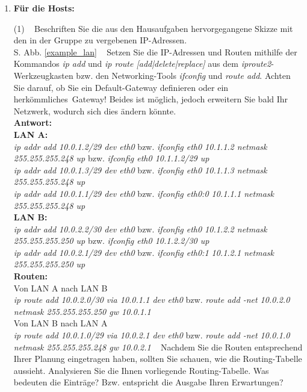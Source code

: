 \documentclass[paper=a4,fontsize=11pt]{scrartcl}%
\numberwithin{equation}{section}
\begin{document}
\begin{enumerate}
	\item \textbf{Für die Hosts:}\\
	\begin{tasks}(1)
		\task~ Beschriften Sie die aus den Hausaufgaben hervorgegangene Skizze mit den in der Gruppe zu vergebenen IP-Adressen.\\
		S. Abb. \ref{example_lan}
		\task~ Setzen Sie die IP-Adressen und Routen mithilfe der Kommandos \emph{ip add} und \emph{ip route [add|delete|replace]} aus dem \emph{iproute2}-Werkzeugkasten bzw. den Networking-Tools \emph{ifconfig} und \emph{route add}.  Achten Sie darauf, ob Sie ein Default-Gateway definieren oder ein \glqq herkömmliches\grqq\ Gateway! Beides ist möglich, jedoch erweitern Sie bald Ihr Netzwerk, wodurch sich dies ändern könnte.\\
		\textbf{Antwort:}\\
		\textbf{LAN A:}\\
		\textit{ip addr add 10.0.1.2/29 dev eth0} bzw. \textit{ifconfig eth0 10.1.1.2 netmask 255.255.255.248 up} bzw. \textit{ifconfig eth0 10.1.1.2/29 up}\\
		\textit{ip addr add 10.0.1.3/29 dev eth0} bzw. \textit{ifconfig eth0 10.1.1.3 netmask 255.255.255.248 up}\\
		\textit{ip addr add 10.0.1.1/29 dev eth0} bzw. \textit{ifconfig eth0:0 10.1.1.1 netmask 255.255.255.248 up}\\
		\textbf{LAN B:}\\
		\textit{ip addr add 10.0.2.2/30 dev eth0} bzw. \textit{ifconfig eth0 10.1.2.2 netmask 255.255.255.250 up} bzw. \textit{ifconfig eth0 10.1.2.2/30 up}\\
		\textit{ip addr add 10.0.2.1/29 dev eth0} bzw. \textit{ifconfig eth0:1 10.1.2.1 netmask 255.255.255.250 up}\\
		\textbf{Routen:}\\
		Von LAN A nach LAN B\\
		\textit{ip route add 10.0.2.0/30 via 10.0.1.1 dev eth0} bzw. \textit{route add -net 10.0.2.0 netmask 255.255.255.250 gw 10.0.1.1}\\
		Von LAN B nach LAN A\\
		\textit{ip route add 10.0.1.0/29 via 10.0.2.1 dev eth0} bzw. \textit{route add -net 10.0.1.0 netmask 255.255.255.248 gw 10.0.2.1}
		\task~ Nachdem Sie die Routen entsprechend Ihrer Planung eingetragen haben, sollten Sie schauen, wie die Routing-Tabelle aussieht. Analysieren Sie die Ihnen vorliegende Routing-Tabelle. Was bedeuten die Einträge? Bzw. entspricht die Ausgabe Ihren Erwartungen?\\

\end{tasks}
\end{enumerate}
\end{document}

